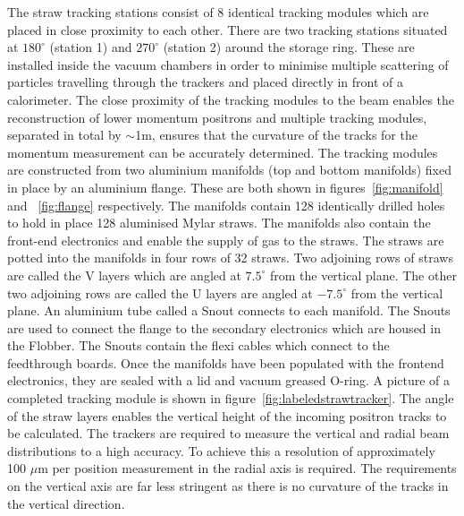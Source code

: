 The straw tracking stations consist of 8 identical tracking modules which are placed in close proximity to each other. There are two tracking stations situated at $180^{\circ}$ (station 1) and $270^{\circ}$ (station 2) around the storage ring. These are installed inside the vacuum chambers in order to minimise multiple scattering of particles travelling through the trackers and placed directly in front of a calorimeter. The close proximity of the tracking modules to the beam enables the reconstruction of lower momentum positrons and multiple tracking modules, separated in total by $\sim$1m, ensures that the curvature of the tracks for the momentum measurement can be accurately determined. The tracking modules are constructed from two aluminium manifolds (top and bottom manifolds) fixed in place by an aluminium flange. These are both shown in figures~\ref{fig:manifold} and ~\ref{fig:flange} respectively. The manifolds contain 128 identically drilled holes to hold in place 128 aluminised Mylar straws. The manifolds also contain the front-end electronics and enable the supply of gas to the straws. The straws are potted into the manifolds in four rows of 32 straws. Two adjoining rows of straws are called the V layers which are angled at $7.5^{\circ}$ from the vertical plane. The other two adjoining rows are called the U layers are angled at $-7.5^{\circ}$ from the vertical plane. An aluminium tube called a Snout connects to each manifold. The Snouts are used to connect the flange to the secondary electronics which are housed in the Flobber. The Snouts contain the flexi cables which connect to the feedthrough boards. Once the manifolds have been populated with the frontend electronics, they are sealed with a lid and vacuum greased O-ring. A picture of a completed tracking module is shown in figure~\ref{fig:labeledstrawtracker}. The angle of the straw layers enables the vertical height of the incoming positron tracks to be calculated. The trackers are required to measure the vertical and radial beam distributions to a high accuracy. To achieve this a resolution of approximately 100 $\mu$m per position measurement in the radial axis is required. The requirements on the vertical axis are far less stringent as there is no curvature of the tracks in the vertical direction. 

